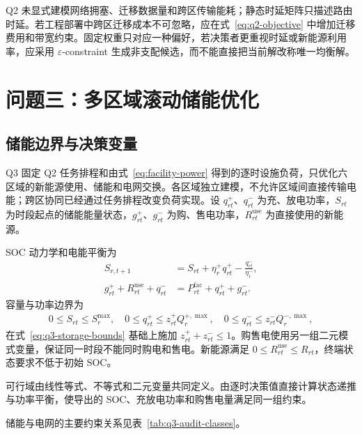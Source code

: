 Q2 未显式建模网络拥塞、迁移数据量和跨区传输能耗；静态时延矩阵只描述路由时延。若工程部署中跨区迁移成本不可忽略，应在式~\eqref{eq:q2-objective} 中增加迁移费用和带宽约束。固定权重只对应一种偏好，若决策者更重视时延或新能源利用率，应采用 $\varepsilon$-constraint 生成非支配候选，而不能直接把当前解改称唯一均衡解。

\section{问题三：多区域滚动储能优化}
\label{sec:q3}

\subsection{储能边界与决策变量}

Q3 固定 Q2 任务排程和由式~\eqref{eq:facility-power} 得到的逐时设施负荷，只优化六区域的新能源使用、储能和电网交换。各区域独立建模，不允许区域间直接传输电能；跨区协同已经通过任务排程改变负荷实现。设 $q^+_{rt}$、$q^-_{rt}$ 为充、放电功率，$S_{rt}$ 为时段起点的储能能量状态，$g^+_{rt}$、$g^-_{rt}$ 为购、售电功率，$R^{\mathrm{use}}_{rt}$ 为直接使用的新能源。

SOC 动力学和电能平衡为
\begin{align}
  S_{r,t+1}&=S_{rt}+\eta_r^+q^+_{rt}-\frac{q^-_{rt}}{\eta_r^-},
  \label{eq:q3-soc}\\
  g^+_{rt}+R^{\mathrm{use}}_{rt}+q^-_{rt}
  &=P^{\mathrm{fac}}_{rt}+q^+_{rt}+g^-_{rt}.
  \label{eq:q3-balance}
\end{align}
容量与功率边界为
\begin{align}
  0\le S_{rt}\le S_r^{\max},\quad
  0\le q^+_{rt}\le z^+_{rt}Q_r^{+,\max},\quad
  0\le q^-_{rt}\le z^-_{rt}Q_r^{-,\max},
  \label{eq:q3-storage-bounds}
\end{align}
在式~\eqref{eq:q3-storage-bounds} 基础上施加 $z^+_{rt}+z^-_{rt}\le1$。购售电使用另一组二元模式变量，保证同一时段不能同时购电和售电。新能源满足 $0\le R^{\mathrm{use}}_{rt}\le R_{rt}$，终端状态要求不低于初始 SOC。

可行域由线性等式、不等式和二元变量共同定义。由逐时决策值直接计算状态递推与功率平衡，使导出的 SOC、充放电功率和购售电量满足同一组约束。

储能与电网的主要约束关系见表~\ref{tab:q3-audit-classes}。

